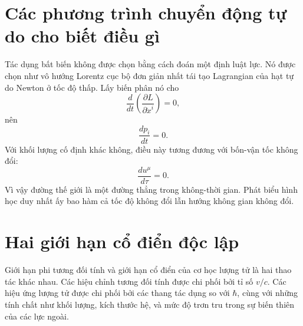 \section{Các phương trình chuyển động tự do cho biết điều gì}

Tác dụng bất biến không được chọn bằng cách đoán một định luật lực. Nó được chọn như vô hướng Lorentz cục bộ đơn giản nhất tái tạo Lagrangian của hạt tự do Newton ở tốc độ thấp. Lấy biến phân nó cho
\begin{equation}
\frac{d}{dt}\left(\frac{\partial L}{\partial\dot x^i}\right)=0,
\end{equation}
nên
\begin{equation}
\frac{dp_i}{dt}=0.
\end{equation}
Với khối lượng cố định khác không, điều này tương đương với bốn-vận tốc không đổi:
\begin{equation}
\frac{du^\mu}{d\tau}=0.
\end{equation}
Vì vậy đường thế giới là một đường thẳng trong không-thời gian. Phát biểu hình học duy nhất ấy bao hàm cả tốc độ không đổi lẫn hướng không gian không đổi.

\begin{classroomqa}
\end{classroomqa}

\section{Hai giới hạn cổ điển độc lập}

Giới hạn phi tương đối tính và giới hạn cổ điển của cơ học lượng tử là hai thao tác khác nhau. Các hiệu chỉnh tương đối tính được chi phối bởi tỉ số \(v/c\). Các hiệu ứng lượng tử được chi phối bởi các thang tác dụng so với \(\hbar\), cùng với những tính chất như khối lượng, kích thước hệ, và mức độ trơn tru trong sự biến thiên của các lực ngoài.

